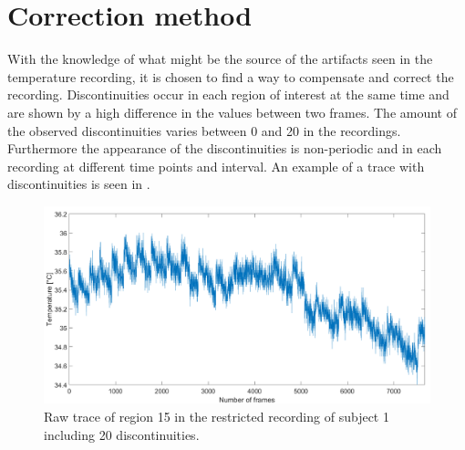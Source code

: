 \section{Correction method}
\label{sec:correction_method}
With the knowledge of what might be the source of the artifacts seen in the temperature recording, it is chosen to find a way to compensate and correct the recording.
Discontinuities occur in each region of interest at the same time and are shown by a high difference in the values between two frames. The amount of the observed discontinuities varies between 0 and 20 in the recordings. Furthermore the appearance of the discontinuities is non-periodic and in each recording at different time points and interval. An example of a trace with discontinuities is seen in .
\begin{figure}[H]
	\includegraphics[width=1\textwidth]{figures/raw15}
	\caption{Raw trace of region 15 in the restricted recording of subject 1 including 20 discontinuities.}
	\label{fig:raw15}
\end{figure}

